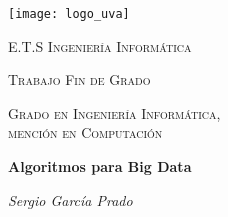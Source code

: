 \documentclass{subfiles}
\begin{document}
  \begin{titlepage}

    \centering
    \texttt{[image: logo\_uva]}\par\vspace{1cm}

    {\scshape\LARGE E.T.S Ingeniería Informática \par}
    \vspace{1cm}

    {\scshape\Large Trabajo Fin de Grado\par}
    \vspace{1.5cm}

    {\scshape\Large Grado en Ingeniería Informática, \\ mención en Computación\par}
    \vspace{1.5cm}

    {\huge\bfseries Algoritmos para Big Data\par}
    \vspace{2cm}

    {\Large\itshape Sergio García Prado \par}
    \vfill

  \end{titlepage}
\end{document}
